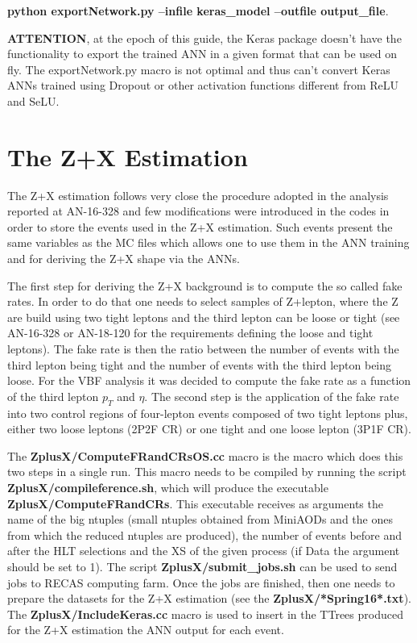 \documentclass[]{report}
\begin{document}
\textbf{python exportNetwork.py --infile keras\_model --outfile output\_file}.

{\color{red}\textbf{ATTENTION}}, at the epoch of this guide, the Keras package doesn't have the functionality to export the trained ANN in a given format that can be used on fly. The exportNetwork.py macro is not optimal and thus can't convert Keras ANNs trained using Dropout or other activation functions different from ReLU and SeLU.

\section{The Z+X Estimation}
The Z+X estimation follows very close the procedure adopted in the analysis reported at AN-16-328 and few modifications were introduced in the codes in order to store the events used in the Z+X estimation. Such events present the same variables as the MC files which allows one to use them in the ANN training and for deriving the Z+X shape via the ANNs.

The first step for deriving the Z+X background is to compute the so called fake rates. In order to do that one needs to select samples of Z+lepton, where the Z are build using two tight leptons and the third lepton can be loose or tight (see AN-16-328 or AN-18-120 for the requirements defining the loose and tight leptons). The fake rate is then the ratio between the number of events with the third lepton being tight and the number of events with the third lepton being loose. For the VBF analysis it was decided to compute the fake rate as a function of the third lepton $p_{T}$ and $\eta$. The second step is the application of the fake rate into two control regions of four-lepton events composed of two tight leptons plus, either two loose leptons (2P2F CR) or one tight and one loose lepton (3P1F CR).

The \textbf{ZplusX/ComputeFRandCRsOS.cc} macro is the macro which does this two steps in a single run. This macro needs to be compiled by running the script \textbf{ZplusX/compileference.sh}, which will produce the executable \textbf{ZplusX/ComputeFRandCRs}. This executable receives as arguments the name of the big ntuples (small ntuples obtained from MiniAODs and the ones from which the reduced ntuples are produced), the number of events before and after the HLT selections and the XS of the given process (if Data the argument should be set to 1). The script \textbf{ZplusX/submit\_jobs.sh} can be used to send jobs to RECAS computing farm. Once the jobs are finished, then one needs to prepare the datasets for the Z+X estimation (see the \textbf{ZplusX/*Spring16*.txt}). The \textbf{ZplusX/IncludeKeras.cc} macro is used to insert in the TTrees produced for the Z+X estimation the ANN output for each event. 
\end{document}
